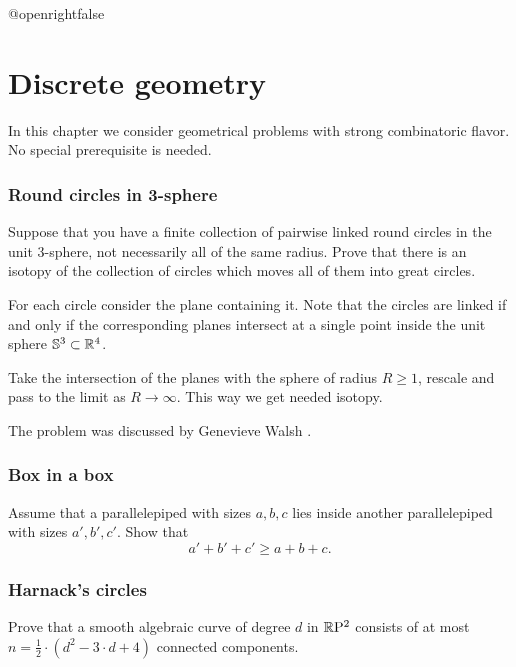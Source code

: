 \csname @openrightfalse\endcsname
\chapter{Discrete geometry}

In this chapter we consider geometrical problems with strong combinatoric flavor.
No special prerequisite is needed.

\subsection*{Round circles in 3-sphere}\label{Round circles}

\begin{pr}
Suppose that you have a finite collection of pairwise linked round circles in the unit 3-sphere, 
not necessarily all of the same radius. 
Prove that there is an isotopy of the collection of circles 
which moves all of them into great circles.
\end{pr}


For each circle consider the plane containing it.
Note that the circles are linked 
if and only if 
the corresponding planes intersect at a single point inside the unit sphere $\mathbb{S}^3\subset \mathbb{R}^4$.

Take the intersection of the planes with the sphere of radius $R\ge 1$,
rescale and pass to the limit as $R\to\infty$.  
This way we get needed isotopy.\qeds

The problem was discussed 
by Genevieve Walsh \cite[see][]{walsh}.

\subsection*{Box in a box}\label{box-in-box}

\begin{pr}
Assume that a parallelepiped with sizes $a,b,c$ 
lies inside another parallelepiped with sizes $a',b',c'$. 
Show that 
\[a'+b'+c'\ge a+b+c.\]

\end{pr}

\subsection*{Harnack's circles}\label{Harnack}

\begin{pr}
Prove that a smooth algebraic curve of degree $d$ in $\mathbb{R}\mathrm{P}^2$ consists of at most $n=\tfrac12\cdot(d^2-3\cdot d+4)$ connected components.
\end{pr}

